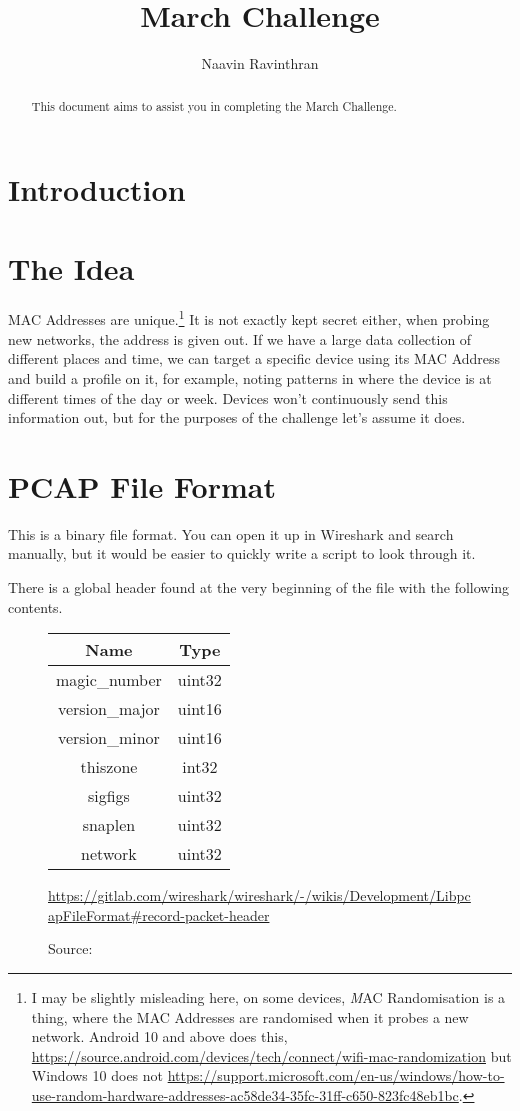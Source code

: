 \documentclass[a4paper,10pt, twocolumn]{article}
\title{March Challenge}
\author{Naavin Ravinthran}
\date{}
\begin{document}
\maketitle

\begin{abstract}
This document aims to assist you in completing the March Challenge.
\end{abstract}

\section{Introduction}

\section{The Idea}
MAC Addresses are unique.\footnote{
I may be slightly misleading here, on some devices,
{\emph MAC Randomisation} is a thing, where the MAC Addresses are
randomised when it probes a new network. Android 10 and above does this,
\url{https://source.android.com/devices/tech/connect/wifi-mac-randomization}
but Windows 10 does not \url{https://support.microsoft.com/en-us/windows/how-to-use-random-hardware-addresses-ac58de34-35fc-31ff-c650-823fc48eb1bc}.
} It is not exactly kept secret either, when probing new networks,
the address is given out. If we have a large data collection of
different places and time, we can target a specific device using its
MAC Address and build a profile on it, for example, noting patterns
in where the device is at different times of the day or week. Devices
won't continuously send this information out, but for the purposes
of the challenge let's assume it does.

\section{PCAP File Format}
This is a binary file format. You can open it up in Wireshark and 
search manually, but it would be easier to quickly write a script to
look through it.

There is a global header found at the very beginning of the file 
with the following contents.

\begin{figure}[htbp]
    \centering
    \begin{tabular} {| c | c |}
    \hline
    Name & Type \\
    \hline
    magic\_number & uint32 \\
    \hline
    version\_major & uint16 \\
    \hline
    version\_minor & uint16 \\
    \hline
    thiszone & int32 \\
    \hline
    sigfigs & uint32 \\
    \hline
    snaplen & uint32 \\
    \hline
    network & uint32 \\
    \hline
    \end{tabular}
\caption{Source: }
\url{https://gitlab.com/wireshark/wireshark/-/wikis/Development/LibpcapFileFormat#record-packet-header}


\end{figure}
\end{document}
